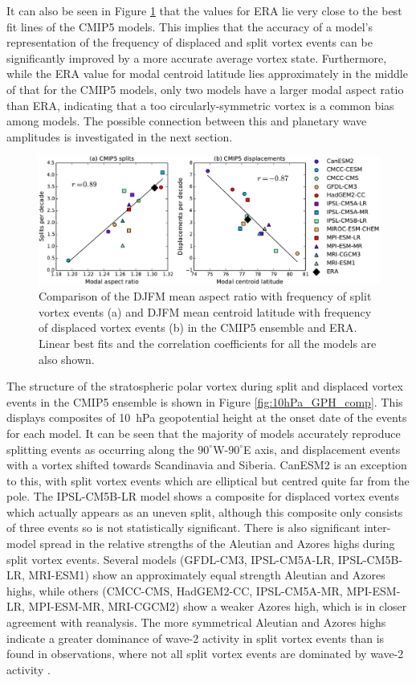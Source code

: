 It can also be seen in Figure \ref{fig:cmip5_moments_scatter} that the values
for ERA lie very close to the best fit lines of the CMIP5 models. This implies
that the accuracy of a model's representation of the frequency of displaced and
split vortex events can be significantly improved by a more accurate average
vortex state. Furthermore, while the ERA value for modal centroid latitude lies
approximately in the middle of that for the CMIP5 models, only two models have a
larger modal aspect ratio than ERA, indicating that a too circularly-symmetric
vortex is a common bias among models. The possible connection between this and
planetary wave amplitudes is investigated in the next section. 

\begin{figure}
 \centering
 \noindent\includegraphics[width=\textwidth]{figures/chapter-models/CMIP5_moments_scatter.pdf}
 \caption[Comparison of moment diagnostics and event frequency]{Comparison of the DJFM mean aspect ratio with frequency of
   split vortex events (a) and DJFM mean centroid latitude with frequency of
   displaced vortex events (b) in the CMIP5 ensemble and ERA. Linear best fits
   and the correlation coefficients for all the models are also shown.}
 \label{fig:cmip5_moments_scatter}
\end{figure}

The structure of the stratospheric polar vortex during split and displaced
vortex events in the CMIP5 ensemble is shown in Figure
\ref{fig:10hPa_GPH_comp}. This displays composites of 10~hPa geopotential height
at the onset date of the events for each model. It can be seen that the majority
of models accurately reproduce splitting events as occurring along the
$90^{\circ}$W-$90^{\circ}$E axis, and displacement events with a vortex shifted
towards Scandinavia and Siberia. CanESM2 is an exception to this, with split
vortex events which are elliptical but centred quite far from the pole. The
IPSL-CM5B-LR model shows a composite for displaced vortex events which actually
appears as an uneven split, although this composite only consists of three
events so is not statistically significant. There is also significant
inter-model spread in the relative strengths of the Aleutian and Azores highs
during split vortex events. Several models (GFDL-CM3, IPSL-CM5A-LR,
IPSL-CM5B-LR, MRI-ESM1) show an approximately equal strength Aleutian and Azores
highs, while others (CMCC-CMS, HadGEM2-CC, IPSL-CM5A-MR, MPI-ESM-LR, MPI-ESM-MR,
MRI-CGCM2) show a weaker Azores high, which is in closer agreement with
reanalysis. The more symmetrical Aleutian and Azores highs indicate a greater
dominance of wave-2 activity in split vortex events than is found in
observations, where not all split vortex events are dominated by wave-2 activity
\citep{Waugh1997,Mitchell2013}.

